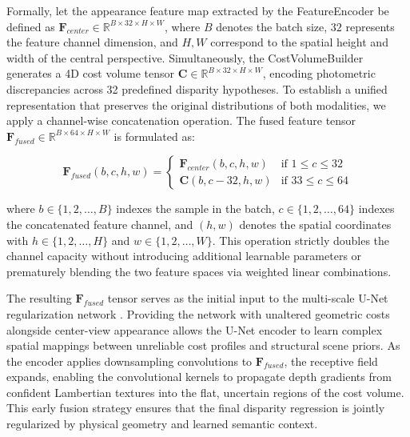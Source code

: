 \documentclass[lettersize,journal]{IEEEtran}
\begin{document}
Formally, let the appearance feature map extracted by the FeatureEncoder be defined as $\mathbf{F}_{center} \in \mathbb{R}^{B \times 32 \times H \times W}$, where $B$ denotes the batch size, $32$ represents the feature channel dimension, and $H, W$ correspond to the spatial height and width of the central perspective. Simultaneously, the CostVolumeBuilder generates a 4D cost volume tensor $\mathbf{C} \in \mathbb{R}^{B \times 32 \times H \times W}$, encoding photometric discrepancies across 32 predefined disparity hypotheses. To establish a unified representation that preserves the original distributions of both modalities, we apply a channel-wise concatenation operation. The fused feature tensor $\mathbf{F}_{fused} \in \mathbb{R}^{B \times 64 \times H \times W}$ is formulated as:

\begin{equation}
\mathbf{F}_{fused}(b, c, h, w) = 
\begin{cases} 
\mathbf{F}_{center}(b, c, h, w) & \text{if } 1 \leq c \leq 32 \\ 
\mathbf{C}(b, c - 32, h, w) & \text{if } 33 \leq c \leq 64 
\end{cases}
\end{equation}

where $b \in \{1, 2, \dots, B\}$ indexes the sample in the batch, $c \in \{1, 2, \dots, 64\}$ indexes the concatenated feature channel, and $(h, w)$ denotes the spatial coordinates with $h \in \{1, 2, \dots, H\}$ and $w \in \{1, 2, \dots, W\}$. This operation strictly doubles the channel capacity without introducing additional learnable parameters or prematurely blending the two feature spaces via weighted linear combinations. 

The resulting $\mathbf{F}_{fused}$ tensor serves as the initial input to the multi-scale U-Net regularization network \cite{ronneberger2015}. Providing the network with unaltered geometric costs alongside center-view appearance allows the U-Net encoder to learn complex spatial mappings between unreliable cost profiles and structural scene priors. As the encoder applies downsampling convolutions to $\mathbf{F}_{fused}$, the receptive field expands, enabling the convolutional kernels to propagate depth gradients from confident Lambertian textures into the flat, uncertain regions of the cost volume. This early fusion strategy ensures that the final disparity regression is jointly regularized by physical geometry and learned semantic context.

\subsection{}
\end{document}
